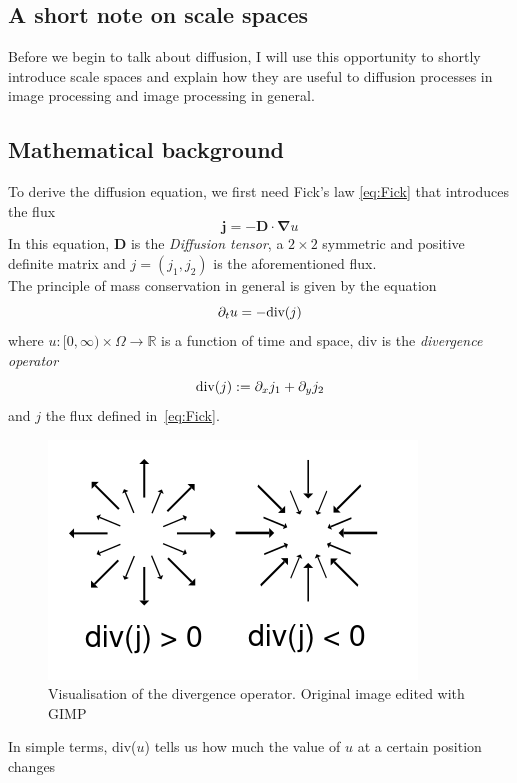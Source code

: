 \subsection{A short note on scale spaces}
Before we begin to talk about diffusion, I will use this opportunity to shortly introduce scale
spaces and explain how they are useful to diffusion processes in image processing and image
processing in general.\\

\subsection{Mathematical background}
To derive the diffusion equation, we first need Fick's law \eqref{eq:Fick} that introduces the
flux
\begin{equation}
    \boldsymbol j = -\boldsymbol D\cdot\boldsymbol\nabla u\label{eq:Fick}
\end{equation}
In this equation, $\boldsymbol D$ is the \textit{Diffusion tensor}, a $2\times2$ symmetric and
positive definite matrix and $j = (j_1, j_2)$ is the aforementioned flux.\cite{dic18-02}\\
The principle of mass conservation in general is given by the equation
\begin{equation}
    \partial_t u = - \textnormal{div}(j)\label{eq:Conservation}
\end{equation}
where $u: [0, \infty) \times \Omega \rightarrow \mathbb{R}$ is a function of time and space, div
is the \textit{divergence operator}
\[\textnormal{div}(j) := \partial_x j_1 + \partial_y j_2\]
and $j$ the flux defined in~\eqref{eq:Fick}.\\
\begin{figure}[h]
    \centering
    \includegraphics[width=0.5\linewidth]{../Images/divergence2.png}
    \caption{Visualisation of the divergence operator. Original image \cite{img-divergence}
    edited with GIMP}\label{fig:Divergence}
\end{figure}
In simple terms, div($u$) tells us how much the value of $u$ at a certain position changes
